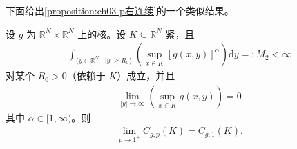 \documentclass[../../main.tex]{subfiles}%
\begin{document}
下面给出\cref{proposition:ch03-p右连续}的一个类似结果。

\begin{proposition}\label{proposition:ch03-p趋近1}
设 $g$ 为 $\mathbb{R}^N\times\mathbb{R}^N$ 上的核。设 $K\subseteq\mathbb{R}^N$ 紧，且
\begin{align}
\int_{\{y\in\mathbb{R}^N\mid|y|\geqslant R_0\}}\left(\sup_{x\in K}[g(x,y)]^\alpha\right)\mathrm{d}y=:M_2<\infty\label{align:ch03-3.40a}
\end{align}
对某个 $R_0>0$（依赖于 $K$）成立，并且
\begin{align}
\lim_{|y|\to\infty}\left(\sup_{x\in K}g(x,y)\right)=0\label{align:ch03-3.40b}
\end{align}
其中 $\alpha\in[1,\infty)$。则
\begin{align}
\lim_{p\to1^+}C_{g,p}(K)=C_{g,1}(K).\label{align:ch03-3.41}
\end{align}
\end{proposition}
\end{document}

